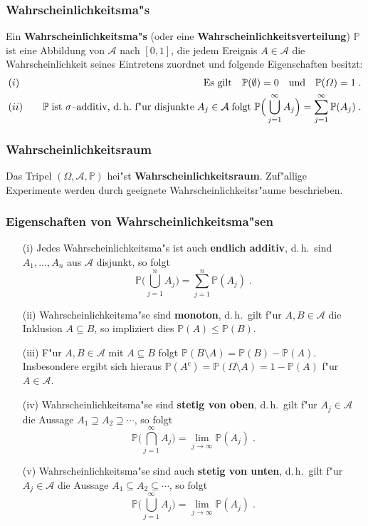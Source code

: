 \documentclass[ngerman,draft,parskip=half,twoside]{scrartcl}
\newtheorem{thm}{Satz}[section]
\newcommand*{\Algeb}{\mathcal{A}}   %
\newcommand*{\WKM}{\mathbb{P}}      %
\begin{document}
\subsubsection{Wahrscheinlichkeitsma"s}
Ein \textbf{Wahrscheinlichkeitsma"s} (oder eine \textbf{Wahrscheinlichkeitsverteilung})
 $\WKM$ ist eine Abbildung von
$\Algeb$ nach $[0,1]$, die jedem Ereignis $A\in \Algeb$ die Wahrscheinlichkeit seines
Eintretens zuordnet und folgende Eigenschaften besitzt$\colon$
\begin{eqnarray*}
&(i)&\quad\mbox{Es gilt}\quad \WKM(\emptyset)=0\quad\mbox{und}\quad \WKM(\Omega)=1\;.\\
&(ii)&\quad
\WKM\;\mbox{ist $\sigma$--additiv, d.\,h.~f"ur disjunkte}\;A_j\in\Algeb\;\mbox{folgt}\;
\WKM\Big(\bigcup_{j=1}^\infty A_j\Big)=\sum_{j=1}^\infty\WKM(A_j)\;.
\end{eqnarray*}
\subsubsection{Wahrscheinlichkeitsraum}
Das Tripel $(\Omega,\Algeb,\WKM)$ hei"st \textbf{Wahrscheinlichkeitsraum}. Zuf"allige
Experimente werden durch geeignete Wahrscheinlichkeitsr"aume  beschrieben.
\subsubsection{Eigenschaften von Wahrscheinlichkeitsma"sen}
\begin{enumerate}
\item[\rm(i)]
Jedes Wahrscheinlichkeitsma"s ist auch \textbf{endlich additiv}, d.\,h.~sind
$A_1,\ldots,A_n$ aus $\Algeb$ disjunkt, so folgt
$$
\WKM\Big(\bigcup_{j=1}^n A_j\Big)=\sum_{j=1}^n\WKM(A_j)\;.
$$
\item[\rm(ii)]
Wahrscheinlichkeitsma"se sind \textbf{monoton}, d.\,h.~gilt f"ur $A,B\in\Algeb$ die Inklusion
$A\subseteq B$, so impliziert dies $\WKM(A)\le\WKM(B)$.
\item[\rm(iii)]
F"ur $A,B\in\Algeb$ mit $A\subseteq B$ folgt $\WKM(B\setminus A)=\WKM(B)-\WKM(A)$. Insbesondere ergibt sich hieraus
$\WKM(A^c)=\WKM(\Omega\setminus A)=1-\WKM(A)$ f"ur $A\in\Algeb$.
\item[\rm(iv)]
Wahrscheinlichkeitsma"se sind \textbf{stetig von oben}, d.\,h.~gilt f"ur $A_j\in\Algeb$
die Aussage $A_1\supseteq A_2\supseteq\cdots$,
so folgt
$$
\WKM\Big(\bigcap_{j=1}^\infty A_j\Big)=\lim_{j\to\infty}\WKM(A_j)\;.
$$
\item[\rm(v)]
Wahrscheinlichkeitsma"se sind auch \textbf{stetig von unten}, d.\,h.~gilt f"ur $A_j\in\Algeb$
die Aussage $A_1\subseteq A_2\subseteq\cdots$,
so folgt
$$
\WKM\Big(\bigcup_{j=1}^\infty A_j\Big)=\lim_{j\to\infty}\WKM(A_j)\;.
$$
\end{enumerate}
\end{document}
